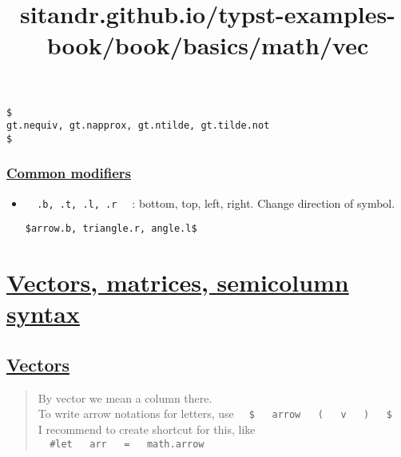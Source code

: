 \begin{verbatim}
$
gt.nequiv, gt.napprox, gt.ntilde, gt.tilde.not
$
\end{verbatim}

\pandocbounded{}

\subsubsection{\texorpdfstring{\hyperref[common-modifiers]{Common
modifiers}}{Common modifiers}}\label{common-modifiers}

\begin{itemize}
\item
  \texttt{\ }{\texttt{\ .b,\ .t,\ .l,\ .r\ }}\texttt{\ } : bottom, top,
  left, right. Change direction of symbol.

\begin{verbatim}
$arrow.b, triangle.r, angle.l$
\end{verbatim}

  \pandocbounded{}
\end{itemize}


\title{sitandr.github.io/typst-examples-book/book/basics/math/vec}

\section{\texorpdfstring{\hyperref[vectors-matrices-semicolumn-syntax]{Vectors,
matrices, semicolumn
syntax}}{Vectors, matrices, semicolumn syntax}}\label{vectors-matrices-semicolumn-syntax}

\subsection{\texorpdfstring{\hyperref[vectors]{Vectors}}{Vectors}}\label{vectors}

\begin{quote}
By vector we mean a column there.\\
To write arrow notations for letters, use
\texttt{\ }{\texttt{\ \$\ }}\texttt{\ }{\texttt{\ arrow\ }}\texttt{\ }{\texttt{\ (\ }}\texttt{\ }{\texttt{\ v\ }}\texttt{\ }{\texttt{\ )\ }}\texttt{\ }{\texttt{\ \$\ }}\texttt{\ }\\
I recommend to create shortcut for this, like
\texttt{\ }{\texttt{\ \#let\ }}\texttt{\ }{\texttt{\ arr\ }}\texttt{\ }{\texttt{\ =\ }}\texttt{\ }{\texttt{\ math.arrow\ }}\texttt{\ }
\end{quote}

